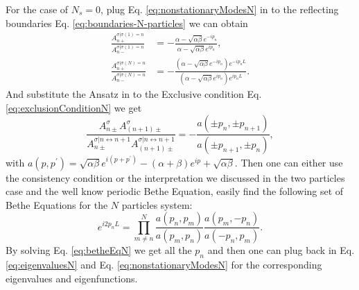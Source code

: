 For the case of $N_s=0$, plug Eq. \eqref{eq:nonstationaryModesN} in to the reflecting boundaries Eq.  \eqref{eq:boundaries-N-particles} we can obtain 
\begin{subequations}
    \label{eq:scatterFactorBoundaryN}
    \begin{align}
        \frac{A_{n+}^{\sigma|\sigma(1)=n}}{A_{n-}^{\sigma|\sigma(1)=n}} & = -\frac{\alpha-\sqrt{\alpha\beta} e^{-ip_{n}}}{\alpha-\sqrt{\alpha\beta} e^{ip_{n}}},\\
        \frac{A_{n+}^{\sigma|\sigma(N)=n}}{A_{n-}^{\sigma|\sigma(N)=n}} & = -\frac{\left(\alpha-\sqrt{\alpha\beta} e^{-ip_{n}}\right) e^{-ip_{n}L}}{\left(\alpha-\sqrt{\alpha\beta} e^{ip_{n}}\right) e^{ip_{n}L}}.
    \end{align}
\end{subequations}
And substitute the Ansatz in to the Exclusive condition Eq.  \eqref{eq:exclusionConditionN} we get
\begin{equation}
    \label{eq:scatterFactorExclusiveN}
        \frac{A_{n\pm}^{\sigma}A_{(n+1)\pm}^{\sigma}}{A_{n\pm}^{\sigma| n\leftrightarrow n+1}A_{(n+1)\pm}^{\sigma|n\leftrightarrow n+1}}  =  -\frac{a(\pm p_{n},\pm p_{n+1})}{a(\pm p_{n+1}, \pm p_{n})},
\end{equation}
with $a(p, p^{\prime}) =  \sqrt{\alpha\beta}e^{i(p+p^{\prime})} - (\alpha + \beta) e^{i p} + \sqrt{\alpha\beta}$. 
Then one can either use the consistency condition or the interpretation we discussed in the two particles case and the well know periodic Bethe Equation, easily find the following set of Bethe Equations for the $N$ particles system:
\begin{equation}
    \label{eq:betheEqN}
    e^{i2p_nL}  =  \prod_{m\neq n}^N\frac{a(p_n, p_m)}{a(p_m, p_n)} \frac{a(p_m, -p_n)}{a(-p_n, p_m)}.
\end{equation}
By solving Eq. \eqref{eq:betheEqN} we get all the $p_n$ and then one can plug back in Eq. \eqref{eq:eigenvaluesN} and Eq. \eqref{eq:nonstationaryModesN} for the corresponding eigenvalues and eigenfunctions. 

